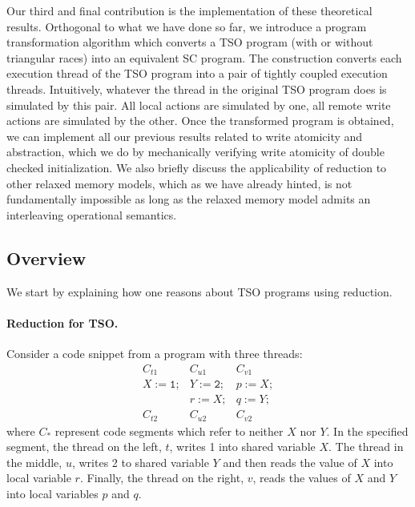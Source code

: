 \documentclass[preprint,9pt]{sigplanconf}
\begin{document}
Our third and final contribution is the implementation of these theoretical results.
Orthogonal to what we have done so far, we introduce a program transformation algorithm which converts a TSO program (with or without triangular races) into an equivalent SC program.
The construction converts each execution thread of the TSO program into a pair of tightly coupled execution threads.
Intuitively, whatever the thread in the original TSO program does is simulated by this pair. 
All local actions are simulated by one, all remote write actions are simulated by the other.
Once the transformed program is obtained, we can implement all our previous results related to write atomicity and abstraction, which we do by mechanically verifying write atomicity of double checked initialization.
We also briefly discuss the applicability of reduction to other relaxed memory models, which as we have already hinted, is not fundamentally impossible as long as the relaxed memory model admits an interleaving operational semantics.
 
\subsection{Overview}
\label{subsec:overview}
We start by explaining how one reasons about TSO programs using reduction.

\paragraph{Reduction for TSO.}
Consider a code snippet from a program with three threads:
\begin{eqnarray*} 
 C_{t1} &  C_{u1} &  C_{v1}\\
X \mathtt{:= 1;} &  Y\mathtt{:= 2;} &  p\mathtt{:=}X\mathtt{;}\\
& r\mathtt{:= }X\mathtt{;} &  q\mathtt{:=}Y\mathtt{;}\\
C_{t2} & C_{u2} & C_{v2}
\end{eqnarray*}
where $C_*$ represent code segments which refer to neither $X$ nor $Y$.
In the specified segment, the thread on the left, $t$, writes 1 into shared variable $X$.
The thread in the middle, $u$, writes 2 to shared variable $Y$ and then reads the value of $X$ into local variable $r$.
Finally, the thread on the right, $v$, reads the values of $X$ and $Y$ into local variables $p$ and $q$.
\end{document}
